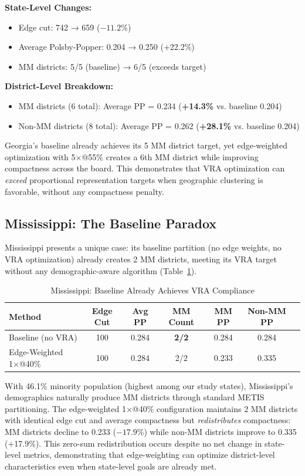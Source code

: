 \textbf{State-Level Changes:}
\begin{itemize}
    \item Edge cut: 742 → 659 ($-11.2$\%)
    \item Average Polsby-Popper: 0.204 → 0.250 (+22.2\%)
    \item MM districts: 5/5 (baseline) → 6/5 (exceeds target)
\end{itemize}

\textbf{District-Level Breakdown:}
\begin{itemize}
    \item MM districts (6 total): Average PP = 0.234 (\textbf{+14.3\%} vs. baseline 0.204)
    \item Non-MM districts (8 total): Average PP = 0.262 (\textbf{+28.1\%} vs. baseline 0.204)
\end{itemize}

Georgia's baseline already achieves its 5 MM district target, yet edge-weighted optimization with 5×@55\% creates a 6th MM district while improving compactness across the board. This demonstrates that VRA optimization can \emph{exceed} proportional representation targets when geographic clustering is favorable, without any compactness penalty.

\subsection{Mississippi: The Baseline Paradox}

Mississippi presents a unique case: its baseline partition (no edge weights, no VRA optimization) already creates 2 MM districts, meeting its VRA target without any demographic-aware algorithm (Table~\ref{tab:mississippi-analysis}).

\begin{table}[htbp]
\centering
\caption{Mississippi: Baseline Already Achieves VRA Compliance}
\label{tab:mississippi-analysis}
\begin{tabular}{lcccccc}
\toprule
\textbf{Method} & \textbf{Edge Cut} & \textbf{Avg PP} & \textbf{MM Count} & \textbf{MM PP} & \textbf{Non-MM PP} \\
\midrule
Baseline (no VRA) & 100 & 0.284 & \textbf{2/2} & 0.284 & 0.284 \\
Edge-Weighted 1×@40\% & 100 & 0.284 & 2/2 & 0.233 & 0.335 \\
\bottomrule
\end{tabular}
\end{table}

With 46.1\% minority population (highest among our study states), Mississippi's demographics naturally produce MM districts through standard METIS partitioning. The edge-weighted 1×@40\% configuration maintains 2 MM districts with identical edge cut and average compactness but \emph{redistributes} compactness: MM districts decline to 0.233 ($-17.9$\%) while non-MM districts improve to 0.335 (+17.9\%). This zero-sum redistribution occurs despite no net change in state-level metrics, demonstrating that edge-weighting can optimize district-level characteristics even when state-level goals are already met.

